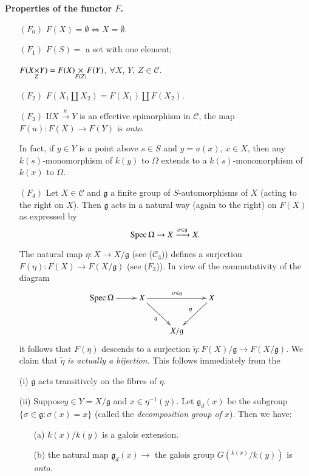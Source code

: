 \medskip
\noindent
{\bf Properties of the functor {\boldmath$F$}.}
\smallskip

\begin{itemize}
\item[$(F_{0})$] $F(X)=\emptyset\Leftrightarrow X=\emptyset$.

\item[$(F_{1})$] $F(S)=$ a set with one element;

$F(\fprod{X}{Y}{Z})=\fprod{F(X)}{F(Y)}{F(Z)}$, $\forall X$, $Y$, $Z\in
  \mathscr{C}$. 

\item[$(F_{2})$] $F(X_{1}\coprod X_{2})=F(X_{1})\coprod F(X_{2})$. 

\item[$(F_{3})$] If\pageoriginale $X\xrightarrow{u}Y$ is an effective
  epimorphism in $\mathscr{C}$, the map $F(u):F(X)\to F(Y)$ is {\em onto}.

In fact, if $y\in Y$ is a point above $s\in S$ and $y=u(x)$, $x\in X$,
then any $k(s)$-monomorphism of $k(y)$ to $\Omega$ extends to a
$k(s)$-monomorphism of $k(x)$ to $\Omega$.

\item[$(F_{4})$] Let $X\in\mathscr{C}$ and $\mathfrak{g}$ a finite
  group of $S$-automorphisms of $X$ (acting to the right on $X$). Then
  $\mathfrak{g}$ acts in a natural way (again to the right) on $F(X)$
  as expressed by
$$
\operatorname{Spec} \Omega\to X\xrightarrow{\sigma\in\mathfrak{g}}X.
$$

The natural map $\eta:X\to X/\mathfrak{g}$ (see ($\mathscr{C}_{3}$))
defines a surjection $F(\eta):F(X)\to F(X/\mathfrak{g})$ (see
($F_{3}$)). In view of the commutativity of the diagram
\[
\xymatrix{
\Spec \Omega \ar[r] & X\ar[dr]_{\eta} \ar[rr]^{\sigma\in \mathfrak{g}}
& & X\ar[dl]_{\eta}\\ 
 & & X/\mathfrak{g} & &
}
\]
it follows that $F(\eta)$ descends to a surjection
$\widetilde{\eta}:F(X)/\mathfrak{g}\to F(X/\mathfrak{g})$. We claim
that $\widetilde{\eta}$ {\em is actually a bijection.} This follows
immediately from the
\end{itemize}

\begin{lemma}\label{chap4-lem4.2.1}
\begin{itemize}
\item[\rm(i)] $\mathfrak{g}$ acts transitively on the fibres of $\eta$. 

\item[\rm(ii)] Suppose\pageoriginale $y\in Y=X/\mathfrak{g}$ and $x\in
  \eta^{-1}(y)$. Let $\mathfrak{g}_{d}(x)$ be the subgroup
  $\{\sigma\in\mathfrak{g}:\sigma(x)=x\}$ (called the {\em
    decomposition group of $x$}). Then we have:
\begin{itemize}
\item[\rm(a)] $k(x)/k(y)$ is a galois extension.

\item[\rm(b)] the natural map $\mathfrak{g}_{d}(x)\to$ the galois group
  $G({}^{k(x)}/k(y))$ is {\em onto}.
\end{itemize}
\end{itemize}
\end{lemma}

